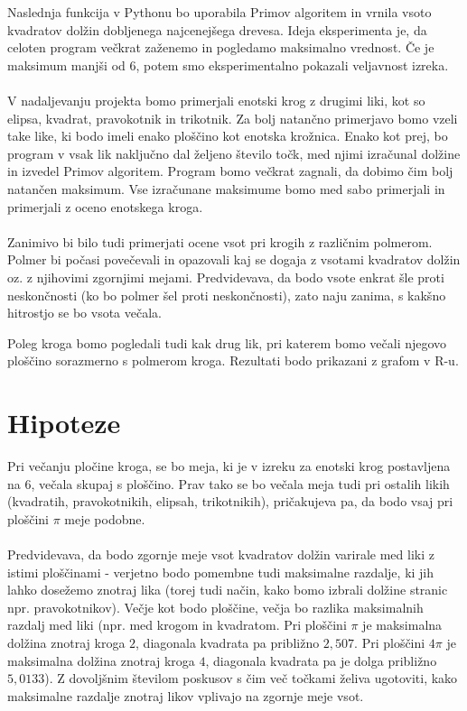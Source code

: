 \documentclass[a4paper]{report}
\begin{document}
Naslednja funkcija v Pythonu bo uporabila Primov algoritem in vrnila vsoto kvadratov dolžin dobljenega najcenejšega drevesa. Ideja eksperimenta je, da celoten program večkrat zaženemo in pogledamo maksimalno vrednost. Če je maksimum manjši od 6, potem smo eksperimentalno pokazali veljavnost izreka. 
\\
\\
V nadaljevanju projekta bomo primerjali enotski krog z drugimi liki, kot so elipsa, kvadrat, pravokotnik in trikotnik. Za bolj natančno primerjavo bomo vzeli take like, ki bodo imeli enako ploščino kot enotska krožnica. Enako kot prej, bo program v vsak lik naključno dal željeno število točk, med njimi izračunal dolžine in izvedel Primov algoritem. Program bomo večkrat zagnali, da dobimo čim bolj natančen maksimum. Vse izračunane maksimume bomo med sabo primerjali in primerjali z oceno enotskega kroga. 
\\
\\
Zanimivo bi bilo tudi primerjati ocene vsot pri krogih z različnim polmerom. Polmer bi počasi povečevali in opazovali kaj se dogaja z vsotami kvadratov dolžin oz. z njihovimi zgornjimi mejami. Predvidevava, da bodo vsote enkrat šle proti neskončnosti (ko bo polmer šel proti neskončnosti), zato naju zanima, s kakšno hitrostjo se bo vsota večala. 

Poleg kroga bomo pogledali tudi kak drug lik, pri katerem bomo večali njegovo ploščino sorazmerno s polmerom kroga. Rezultati bodo prikazani z grafom v R-u.


\section*{Hipoteze}

Pri večanju pločine kroga, se bo meja, ki je v izreku za enotski krog postavljena na $6$, večala skupaj s ploščino. Prav tako se bo večala meja tudi pri ostalih likih (kvadratih, pravokotnikih, elipsah, trikotnikih), pričakujeva pa, da bodo vsaj pri ploščini $\pi$ meje podobne. \\ \\
Predvidevava, da bodo zgornje meje vsot kvadratov dolžin varirale med liki z istimi ploščinami - verjetno bodo pomembne tudi maksimalne razdalje, ki jih lahko dosežemo znotraj lika (torej tudi način, kako bomo izbrali dolžine stranic npr. pravokotnikov). Večje kot bodo ploščine, večja bo razlika maksimalnih razdalj med liki (npr. med krogom in kvadratom. Pri ploščini $\pi$ je maksimalna dolžina znotraj kroga $2$, diagonala kvadrata pa približno $2,507$. Pri ploščini $4\pi$ je maksimalna dolžina znotraj kroga $4$, diagonala kvadrata pa je dolga približno $5,0133$). Z dovoljšnim številom poskusov s čim več točkami želiva ugotoviti, kako maksimalne razdalje znotraj likov vplivajo na zgornje meje vsot. 
\end{document}
